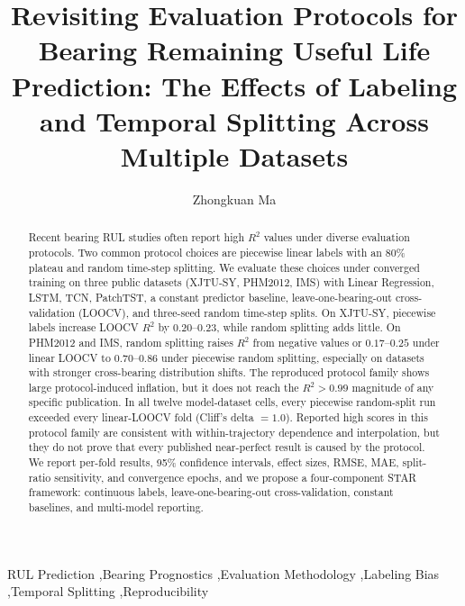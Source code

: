 \documentclass[5p,twocolumn]{elsarticle}
\begin{document}
\begin{frontmatter}

\title{Revisiting Evaluation Protocols for Bearing Remaining Useful Life Prediction: The Effects of Labeling and Temporal Splitting Across Multiple Datasets}

\author[1]{Zhongkuan Ma}

\begin{abstract}
Recent bearing RUL studies often report high $R^2$ values under diverse evaluation protocols. Two common protocol choices are piecewise linear labels with an 80\% plateau and random time-step splitting. We evaluate these choices under converged training on three public datasets (XJTU-SY, PHM2012, IMS) with Linear Regression, LSTM, TCN, PatchTST, a constant predictor baseline, leave-one-bearing-out cross-validation (LOOCV), and three-seed random time-step splits. On XJTU-SY, piecewise labels increase LOOCV $R^2$ by $0.20$--$0.23$, while random splitting adds little. On PHM2012 and IMS, random splitting raises $R^2$ from negative values or $0.17$--$0.25$ under linear LOOCV to $0.70$--$0.86$ under piecewise random splitting, especially on datasets with stronger cross-bearing distribution shifts. The reproduced protocol family shows large protocol-induced inflation, but it does not reach the $R^2>0.99$ magnitude of any specific publication. In all twelve model-dataset cells, every piecewise random-split run exceeded every linear-LOOCV fold (Cliff's delta $=1.0$). Reported high scores in this protocol family are consistent with within-trajectory dependence and interpolation, but they do not prove that every published near-perfect result is caused by the protocol. We report per-fold results, 95\% confidence intervals, effect sizes, RMSE, MAE, split-ratio sensitivity, and convergence epochs, and we propose a four-component STAR framework: continuous labels, leave-one-bearing-out cross-validation, constant baselines, and multi-model reporting.
\end{abstract}

\begin{keyword}
RUL Prediction \sep Bearing Prognostics \sep Evaluation Methodology \sep Labeling Bias \sep Temporal Splitting \sep Reproducibility
\end{keyword}

\end{frontmatter}
\end{document}
